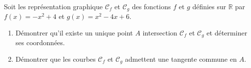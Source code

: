 \documentclass[main.tex]{subfiles}
\begin{document}
\begin{exercise} \label{chapter04:exercice:determinerfonction04}\hfill \\
	Soit les représentation graphique $\mathscr{C}_f$ et $\mathscr{C}_g$ des fonctions $f$ et $g$ définies sur $\mathbb{R}$ par $f(x)=-x^2+4$ et $g(x)=x^2-4x+6$.
	\begin{enumerate}[label={\arabic*)}, leftmargin=*]
		\item Démontrer qu'il existe un unique point $A$  intersection $\mathscr{C}_f$ et $\mathscr{C}_g$ et déterminer ses coordonnées.
		\item Démontrer que les courbes $\mathscr{C}_f$ et $\mathscr{C}_g$ admettent une tangente commune en $A$. 
	\end{enumerate}
\end{exercise}
\end{document}
